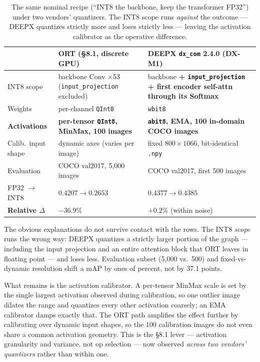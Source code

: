 \documentclass[11pt]{article}
\begin{document}
\begin{table}[htbp]
\centering
\small
\begin{tabular}{L{3.3cm} L{4.6cm} L{5.2cm}}
\toprule
 & \textbf{ORT (\S8.1, discrete GPU)} & \textbf{DEEPX \texttt{dx\_com} 2.4.0 (DX-M1)} \\
\midrule
INT8 scope        & backbone Conv $\times 53$ (\texttt{input\_projection} excluded) & backbone \textbf{+ \texttt{input\_projection} + first encoder self-attn through its Softmax} \\
Weights           & per-channel \texttt{QInt8} & \texttt{wbit8} \\
\textbf{Activations} & \textbf{per-tensor \texttt{QInt8}, MinMax, 100 images} & \textbf{\texttt{abit8}, EMA, 100 in-domain COCO images} \\
Calib.\ input shape & dynamic axes (varies per image) & fixed $800\times1066$, bit-identical \texttt{.npy} \\
Evaluation        & COCO val2017, 5{,}000 images & COCO val2017, first 500 images \\
FP32 $\rightarrow$ INT8 & $0.4207 \rightarrow 0.2653$ & $0.4377 \rightarrow 0.4385$ \\
\textbf{Relative $\Delta$} & $\mathbf{-36.9}$\% & $\mathbf{+0.2}$\% (within noise) \\
\bottomrule
\end{tabular}
\caption{The same nominal recipe (``INT8 the backbone, keep the transformer FP32'') under two vendors' quantizers. The INT8 scope runs \emph{against} the outcome --- DEEPX quantizes strictly more and loses strictly less --- leaving the activation calibrator as the operative difference.}
\label{tab:quantizer}
\end{table}

The obvious explanations do not survive contact with the rows. The INT8 \emph{scope} runs the wrong way: DEEPX quantizes a strictly larger portion of the graph --- including the input projection and an entire attention block that ORT leaves in floating point --- and loses less. Evaluation subset (5{,}000 vs.\ 500) and fixed-vs-dynamic resolution shift a mAP by ones of percent, not by 37.1 points.

What remains is the activation calibrator. A per-tensor MinMax scale is set by the single largest activation observed during calibration, so one outlier image dilates the range and quantizes every other activation coarsely; an EMA calibrator damps exactly that. The ORT path amplifies the effect further by calibrating over dynamic input shapes, so the 100 calibration images do not even share a common activation geometry. This is the \S8.1 lever --- activation granularity and variance, not op selection --- now observed \emph{across two vendors' quantizers} rather than within one.
\end{document}
